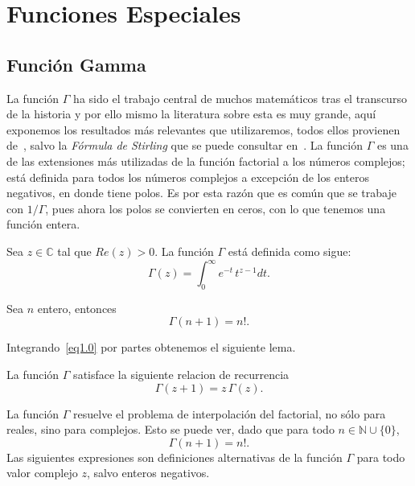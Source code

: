 \documentclass[main.tex]{subfiles}
\begin{document}
\chapter{Funciones Especiales}
\noindent
\section{Función Gamma}
\noindent La función $\Gamma$ ha sido el trabajo central de muchos matemáticos tras el transcurso de la historia y por ello mismo la literatura sobre esta es muy grande, aquí exponemos los resultados más relevantes que utilizaremos, todos ellos provienen de~\cite{epelde}, salvo la \textit{Fórmula de Stirling} que se puede consultar en~\cite[p. 12]{specf}. La funci\'on $\Gamma$ es una de las extensiones m\'as utilizadas de la funci\'on factorial a los n\'umeros complejos; est\'a definida para todos los n\'umeros complejos a excepci\'on de los enteros negativos, en donde tiene polos. Es por esta razón que es común que se trabaje con $1/\Gamma$, pues ahora los polos se convierten en ceros, con lo que tenemos una función entera.
\begin{def.}\label{d1.1} %
Sea $z\in\mathbb{C}$ tal que $Re(z)>0$. La función $\Gamma$ está definida como sigue:
\begin{equation}\label{eq1.0}
  \Gamma(z)=\int_{0}^{\infty}e^{-t}\,t^{z-1}dt.
\end{equation}
\end{def.}
\begin{teorema}\label{gamma-n}
Sea $n$ entero, entonces
\[
  \Gamma(n+1)=n!.
\]
\end{teorema}
Integrando~\eqref{eq1.0} por partes obtenemos el siguiente lema.
\begin{lema}\label{l1.1} %
  La funci\'on $\Gamma$ satisface la siguiente relacion de recurrencia
  \[
    \Gamma(z+1)=z\,\Gamma(z).
  \]
\end{lema}
\indent La función $\Gamma$ resuelve el problema de interpolación del factorial, no sólo para reales, sino para complejos. Esto se puede ver, dado que para todo $n\in\mathbb{N}\cup\{0\}$,
\[
  \Gamma(n+1)=n!.
\]
\indent Las siguientes expresiones son definiciones alternativas de la función $\Gamma$ para todo valor complejo $z$, salvo enteros negativos.
\end{document}
